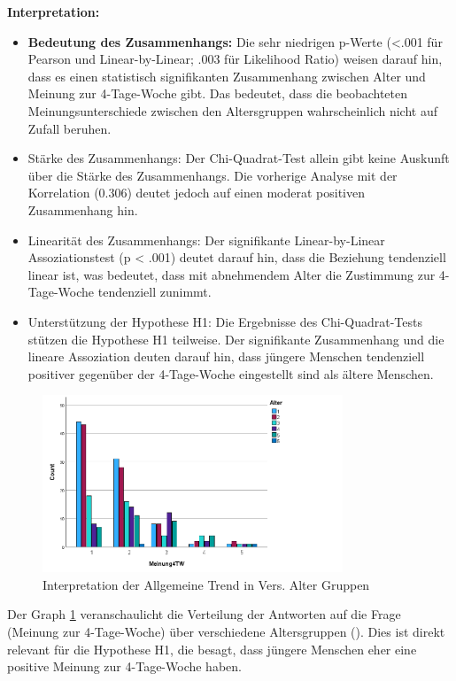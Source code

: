 \textbf{Interpretation:}
\begin{itemize}
    \item \textbf{Bedeutung des Zusammenhangs: }Die sehr niedrigen p-Werte (<.001 für Pearson und 
    Linear-by-Linear; .003 für Likelihood Ratio) weisen darauf hin, dass es einen statistisch 
    signifikanten Zusammenhang zwischen Alter und Meinung zur 4-Tage-Woche gibt. Das bedeutet, dass 
    die beobachteten Meinungsunterschiede zwischen den Altersgruppen wahrscheinlich nicht auf Zufall 
    beruhen.
    \item Stärke des Zusammenhangs: Der Chi-Quadrat-Test allein gibt keine Auskunft über die Stärke 
    des Zusammenhangs. Die vorherige Analyse mit der Korrelation (0.306) deutet jedoch auf einen 
    moderat positiven Zusammenhang hin.
    \item Linearität des Zusammenhangs: Der signifikante Linear-by-Linear Assoziationstest (p < .001) 
    deutet darauf hin, dass die Beziehung tendenziell linear ist, was bedeutet, dass mit abnehmendem 
    Alter die Zustimmung zur 4-Tage-Woche tendenziell zunimmt.
    \item Unterstützung der Hypothese H1: Die Ergebnisse des Chi-Quadrat-Tests stützen die Hypothese 
    H1 teilweise. Der signifikante Zusammenhang und die lineare Assoziation deuten darauf hin, dass 
    jüngere Menschen tendenziell positiver gegenüber der 4-Tage-Woche eingestellt sind als ältere 
    Menschen.
\end{itemize}

\begin{figure}[h]
    \centering
    \includegraphics[width=0.8\textwidth]{04_Artefakte/01_Abbildungen/hypothese_1/h1_graph.png}
    \caption{Interpretation der Allgemeine Trend in Vers. Alter Gruppen}
    \label{fig:h1_graph}
\end{figure}

Der Graph \ref{fig:h1_graph} veranschaulicht die Verteilung der Antworten auf die Frage 
(Meinung zur 4-Tage-Woche) über verschiedene Altersgruppen (). Dies ist direkt relevant für 
die Hypothese H1, die besagt, dass jüngere Menschen eher eine positive Meinung zur 4-Tage-Woche haben.


